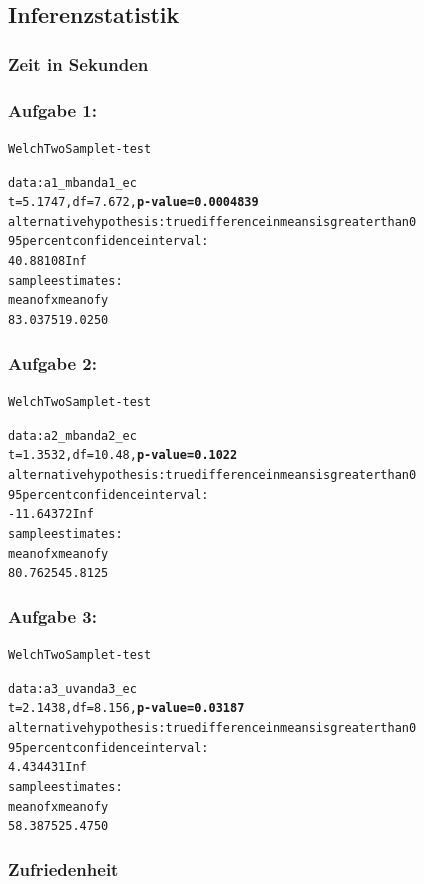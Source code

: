 \documentclass[a4paper,10pt]{scrartcl}
\begin{document}
\subsection{Inferenzstatistik}

\subsubsection*{Zeit in Sekunden} 

\subsubsection*{Aufgabe 1:}

\begin{alltt}
Welch Two Sample t-test

data:  a1_mb and a1_ec 
t = 5.1747, df = 7.672, \textbf{p-value = 0.0004839}
alternative hypothesis: true difference in means is greater than 0 
95 percent confidence interval:
 40.88108      Inf 
sample estimates:
mean of x mean of y 
  83.0375   19.0250 
\end{alltt} 

\subsubsection*{Aufgabe 2:}

\begin{alltt}
Welch Two Sample t-test

data:  a2_mb and a2_ec 
t = 1.3532, df = 10.48, \textbf{p-value = 0.1022}
alternative hypothesis: true difference in means is greater than 0 
95 percent confidence interval:
 -11.64372       Inf 
sample estimates:
mean of x mean of y 
  80.7625   45.8125 
\end{alltt} 

\subsubsection*{Aufgabe 3:}

\begin{alltt}
Welch Two Sample t-test

data:  a3_uv and a3_ec 
t = 2.1438, df = 8.156, \textbf{p-value = 0.03187}
alternative hypothesis: true difference in means is greater than 0 
95 percent confidence interval:
 4.434431      Inf 
sample estimates:
mean of x mean of y 
  58.3875   25.4750 
\end{alltt} 

\subsubsection*{Zufriedenheit} 
\end{document}
